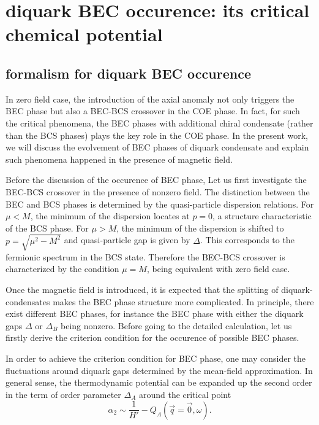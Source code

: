 \documentclass[prd, showpacs,nofootinbib,amsmath,amssymb]{revtex4}
\begin{document}
\section{diquark BEC occurence: its critical chemical potential}
\subsection{formalism for diquark BEC occurence}
In zero field case, the introduction of the axial anomaly not only triggers the BEC phase but also a BEC-BCS crossover in the COE phase.
In fact, for such the critical phenomena, the BEC phases with additional chiral condensate (rather than the BCS phases) plays the key role in the COE phase. In the present work, we will discuss the evolvement of BEC phases of diquark condensate   and explain such phenomena happened in the presence of magnetic field.

Before the discussion of the occurence of BEC phase, Let us first investigate the BEC-BCS crossover in the presence of nonzero field.
The distinction between the BEC and BCS phases is  determined by the  quasi-particle dispersion relations.
For $\mu < M$, the minimum of the dispersion locates at $p=0$, a structure characteristic of  the BCS phase.
For $\mu > M$, the minimum
of the dispersion is shifted to $p = \sqrt{\mu^2-M^2}$ and quasi-particle gap is given by $\Delta$. This corresponds to the fermionic spectrum in the BCS state.
Therefore the BEC-BCS crossover  is characterized by the condition $\mu =M$, being equivalent with zero field case.

Once the magnetic field is introduced, it is expected that the splitting of diquark-condensates makes the BEC phase structure more complicated.
In principle, there exist different BEC phases, for instance the BEC phase with either the diquark gaps $\Delta$ or $\Delta_B$ being nonzero.
Before going to the detailed calculation, let us firstly derive the criterion condition for the
occurence of possible BEC phases.


In order to achieve the criterion condition for BEC phase, one may consider the  fluctuations around diquark gaps determined by
the mean-field approximation.
In general sense,
 the thermodynamic potential can be expanded up the second order in the term of order parameter $\Delta_A$ around the critical point\cite{abuki05}
\begin{equation}\label{eq:omegasecond}
  \alpha_2 \sim \frac{1}{H'}- Q_A(\vec{q} = \vec{0},\omega ).
\end{equation}
\end{document}
